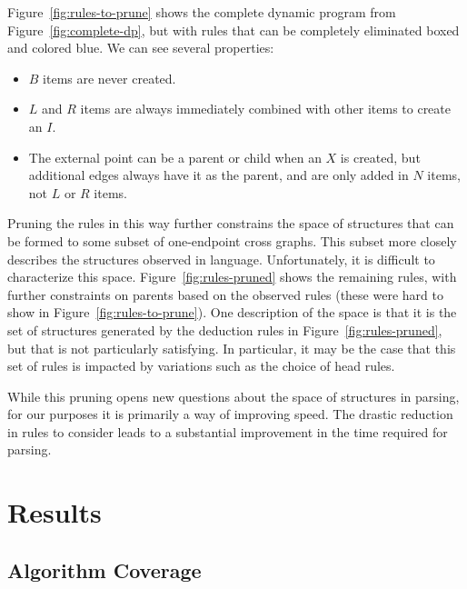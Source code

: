 Figure~\ref{fig:rules-to-prune} shows the complete dynamic program from Figure~\ref{fig:complete-dp}, but with rules that can be completely eliminated boxed and colored blue.
We can see several properties:

\begin{itemize}
  \item $B$ items are never created.
  \item $L$ and $R$ items are always immediately combined with other items to create an $I$.
  \item The external point can be a parent or child when an $X$ is created, but additional edges always have it as the parent, and are only added in $N$ items, not $L$ or $R$ items.
\end{itemize}

Pruning the rules in this way further constrains the space of structures that can be formed to some subset of one-endpoint cross graphs.
This subset more closely describes the structures observed in language.
Unfortunately, it is difficult to characterize this space.
Figure~\ref{fig:rules-pruned} shows the remaining rules, with further constraints on parents based on the observed rules (these were hard to show in Figure~\ref{fig:rules-to-prune}).
One description of the space is that it is the set of structures generated by the deduction rules in Figure~\ref{fig:rules-pruned}, but that is not particularly satisfying.
In particular, it may be the case that this set of rules is impacted by variations such as the choice of head rules.

While this pruning opens new questions about the space of structures in parsing, for our purposes it is primarily a way of improving speed.
The drastic reduction in rules to consider leads to a substantial improvement in the time required for parsing.

\section{Results}

\subsection{Algorithm Coverage} \label{sec:results-coverage}

